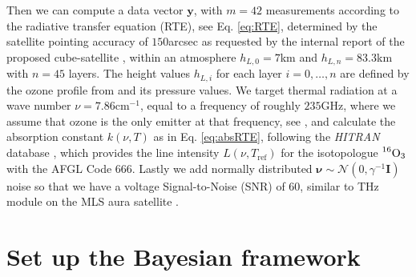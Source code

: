 Then we can compute a data vector $\bm{y}$, with $m = 42$ measurements according to the radiative transfer equation (RTE), see Eq. \ref{eq:RTE}, determined by the satellite pointing accuracy of $150$arcsec as requested by the internal report of the proposed cube-satellite \cite{CubeSatInternal}, within an atmosphere $h_{L,0}=7$km and $h_{L,n} = 83.3$km with $n = 45$ layers.
The height values $h_{L,i}$ for each layer $i = 0,\dots, n$ are defined by the ozone profile from \cite{MLSdata} and its pressure values.
We target thermal radiation at a wave number $\nu = 7.86\text{cm}^{-1}$, equal to a frequency of roughly $235$GHz, where we assume that ozone is the only emitter at that frequency, see \cite{}, and calculate the absorption constant $k(\nu,T)$ as in Eq. \ref{eq:absRTE}, following the \textit{HITRAN} database \cite{gordon2022hitran2020}, which provides the line intensity $L(\nu,T_{\text{ref}})$ for the isotopologue $\prescript{16}{}{\text{O}}_3$ with the AFGL Code 666.
Lastly we add normally distributed $\bm{\nu} \sim \mathcal{N}(0,\gamma^{-1} \bm{I})$ noise so that we have a voltage Signal-to-Noise (SNR) of $60$, similar to THz module on the MLS aura satellite \cite{pickett2006snr}.


\section{Set up the Bayesian framework}
\label{sec:BayModel}


